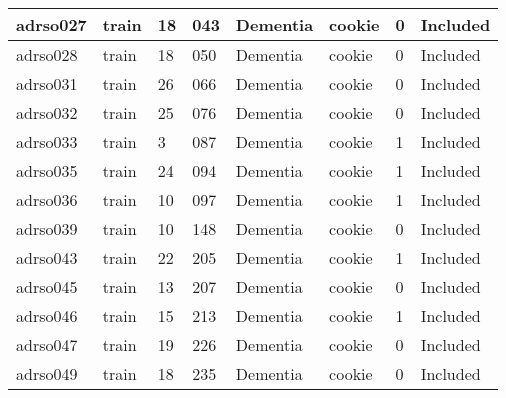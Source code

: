 \begin{center}
\begin{longtable}{|l|l|l|l|l|l|l|l|}
adrso027       & train                 & 18              & 043                & Dementia             & cookie          & 0                & Included      \\ \hline
adrso028       & train                 & 18              & 050                & Dementia             & cookie          & 0                & Included      \\ \hline
adrso031       & train                 & 26              & 066                & Dementia             & cookie          & 0                & Included      \\ \hline
adrso032       & train                 & 25              & 076                & Dementia             & cookie          & 0                & Included      \\ \hline
adrso033       & train                 & 3               & 087                & Dementia             & cookie          & 1                & Included      \\ \hline
adrso035       & train                 & 24              & 094                & Dementia             & cookie          & 1                & Included      \\ \hline
adrso036       & train                 & 10              & 097                & Dementia             & cookie          & 1                & Included      \\ \hline
adrso039       & train                 & 10              & 148                & Dementia             & cookie          & 0                & Included      \\ \hline
adrso043       & train                 & 22              & 205                & Dementia             & cookie          & 1                & Included      \\ \hline
adrso045       & train                 & 13              & 207                & Dementia             & cookie          & 0                & Included      \\ \hline
adrso046       & train                 & 15              & 213                & Dementia             & cookie          & 1                & Included      \\ \hline
adrso047       & train                 & 19              & 226                & Dementia             & cookie          & 0                & Included      \\ \hline
adrso049       & train                 & 18              & 235                & Dementia             & cookie          & 0                & Included      \\ \hline

\end{longtable}
\end{center}
